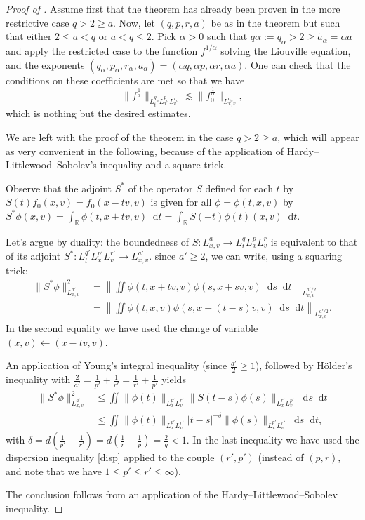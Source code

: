 \documentclass[11pt,a4paper,reqno]{amsart}
\theoremstyle{plain}
\theoremstyle{remark}
\newcommand{\dd}{\mathop{}\!\mathrm{d}}
\begin{document}
\begin{proof}[Proof of ] 
Assume first that the theorem has already been proven in the more restrictive case $q>2\geq a$. Now, let $(q,p,r,a)$ be as in the theorem but such that either $2\leq a<q$ or $a<q\leq 2$. Pick $\alpha>0$ such that $q\alpha := q_{\alpha} > 2 \geq \tilde a_{\alpha}=\alpha a$ and apply the restricted case to the function $f^{1/\alpha}$ solving the Liouville equation, and the exponents $(q_{\alpha},p_{\alpha},r_{\alpha},a_{\alpha})=(\alpha q, \alpha p, \alpha r, \alpha a)$. One can check that the conditions on these coefficients are met so that we have 
\[
    \|f^{\frac{1}{\alpha}}\|_{L^{q_{\alpha}}_tL^{p_{\alpha}}_xL^{r_{\alpha}}_v} \lesssim \|f_0^{\frac{1}{\alpha}}\|_{L^{a_{\alpha}}_{x,v}},
\]
which is nothing but the desired estimates.

We are left with the proof of the theorem in the case $q >2 \geq a$, which will appear as very convenient in the following, because of the application of Hardy--Littlewood--Sobolev's inequality and a square trick. 

Observe that the adjoint $S^*$ of the operator $S$ defined for each $t$ by $S(t)f_0(x,v)=f_0(x-tv,v)$ is given for all $\phi = \phi(t,x,v)$ by $S^*\phi(x,v)=\int_{\mathbb{R}}\phi(t,x+tv,v) \dd t = \int_{\mathbb{R}} S(-t)\phi(t)(x,v)\dd t$. 

Let's argue by duality: the boundedness of $S : L^a_{x,v} \to L^q_tL^p_xL^r_v$ is equivalent to that of its adjoint $S^* : L^{q'}_tL^{p'}_xL^{r'}_v \to L^{a'}_{x,v}$. since $a' \geq 2$, we can write, using a squaring trick:
\begin{align*}
    \|S^*\phi\|_{L^{a'}_{x,v}}^2 &= \left\| \iint \phi(t,x+tv,v)\phi(s,x+sv,v)\dd s \dd t \right\|_{L^{a'/2}_{x,v}} \\
    &= \left\| \iint \phi(t,x,v)\phi(s,x-(t-s)v,v)\dd s \dd t \right\|_{L^{a'/2}_{x,v}}.
\end{align*}
In the second equality we have used the change of variable $(x,v) \leftarrow (x-tv,v)$. 

An application of Young's integral inequality (since $\frac{a'}{2} \geq 1$), followed by Hölder's inequality with $\frac{2}{a'} = \frac{1}{p'} + \frac{1}{r'} = \frac{1}{r'} + \frac{1}{p'}$ yields
\begin{align*}
     \|S^*\phi\|_{L^{a'}_{x,v}}^2  & \leq \iint \|\phi(t)\|_{L^{p'}_xL^{r'}_v}\|S(t-s)\phi(s)\|_{L^{r'}_xL^{p'}_v}\dd s \dd t  \\ 
     &\leq \iint \|\phi(t)\|_{L^{p'}_xL^{r'}_v} |t-s|^{-\delta}\|\phi(s)\|_{L^{p'}_xL^{r'}_v}\dd s \dd t,
\end{align*}
with $\delta = d\left(\frac{1}{p'}-\frac{1}{r'}\right)=d\left(\frac{1}{r}-\frac{1}{p}\right)=\frac{2}{q} <1$. In the last inequality we have used the dispersion inequality \eqref{disp} applied to the couple $(r',p')$ (instead of $(p,r)$, and note that we have $1 \leq p'\leq r' \leq \infty$). 

The conclusion follows from an application of the Hardy--Littlewood--Sobolev inequality.
\end{proof}
\end{document}
